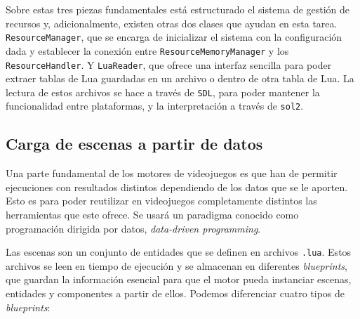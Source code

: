 \medskip

Sobre estas tres piezas fundamentales está estructurado el sistema de gestión de recursos y, adicionalmente, existen otras dos clases que ayudan en esta tarea. \texttt{ResourceManager}, que se encarga de inicializar el sistema con la configuración dada y establecer la conexión entre \texttt{ResourceMemoryManager} y los \texttt{ResourceHandler}. Y \texttt{LuaReader}, que ofrece una interfaz sencilla para poder extraer tablas de Lua guardadas en un archivo o dentro de otra tabla de Lua. La lectura de estos archivos se hace a través de \texttt{SDL}, para poder mantener la funcionalidad entre plataformas, y la interpretación a través de \texttt{sol2}.

\subsection{Carga de escenas a partir de datos}
Una parte fundamental de los motores de videojuegos es que han de permitir ejecuciones con resultados distintos dependiendo de los datos que se le aporten. Esto es para poder reutilizar en videojuegos completamente distintos las herramientas que este ofrece. Se usará un paradigma conocido como programación dirigida por datos, \textit{data-driven programming}. 

\medskip

Las escenas son un conjunto de entidades que se definen en archivos \texttt{.lua}. Estos archivos se leen en tiempo de ejecución y se almacenan en diferentes \textit{blueprints}, que guardan la información esencial para que el motor pueda instanciar escenas, entidades y componentes a partir de ellos. Podemos diferenciar cuatro tipos de \textit{blueprints}: 

